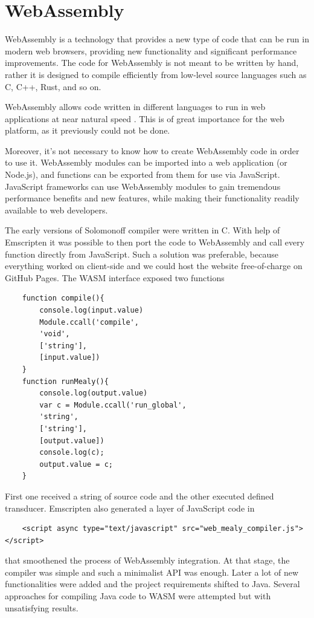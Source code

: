 \section{WebAssembly}

WebAssembly \cite{webassembly} is a technology 
that provides a new type of code 
that can be run in modern web browsers, 
providing new functionality and significant 
performance improvements. The code 
for WebAssembly is not meant to be 
written by hand, rather it is designed 
to compile efficiently from low-level 
source languages
such as C, C++, 
Rust, and so on.

WebAssembly allows code
written
in 
different languages
to run in web applications 
at near natural speed \cite{webassembly_speed,webassembly_speed2,webassembly_speed3}. 
This is of great importance 
for the web platform, as 
it previously could not be done.

Moreover, it's not necessary to know how to create WebAssembly code in order to use it. WebAssembly modules can be imported into a web application (or Node.js), and functions can be exported from them for use via JavaScript. JavaScript frameworks can use WebAssembly modules to gain tremendous performance benefits and new features, while making their functionality readily available to web developers.


The early versions of Solomonoff compiler were written in C. With help of Emscripten it was possible to then port the code to WebAssembly and call every function directly from JavaScript. Such a solution was preferable, because everything worked on client-side and we could host the website free-of-charge on GitHub
Pages. The WASM interface exposed two functions
\begin{lstlisting}
	function compile(){
		console.log(input.value)
		Module.ccall('compile',
		'void',
		['string'], 
		[input.value])
	}
	function runMealy(){
		console.log(output.value)
		var c = Module.ccall('run_global',
		'string',
		['string'], 
		[output.value])
		console.log(c);
		output.value = c;
	}
\end{lstlisting}
First one received a string of source code and the other executed defined transducer. 
Emscripten also generated a layer of JavaScript code in
\begin{lstlisting}
	<script async type="text/javascript" src="web_mealy_compiler.js"></script>
\end{lstlisting}
that smoothened the process of WebAssembly integration.
At that stage, the compiler was simple and such a minimalist API was enough. Later a lot of new functionalities were added and the project requirements shifted to Java. Several approaches for compiling Java code to WASM were attempted but with unsatisfying results.


